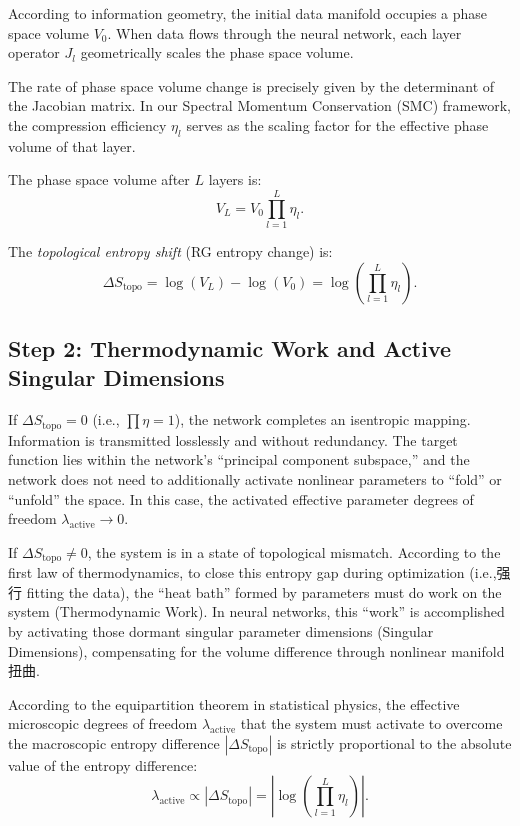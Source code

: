 \documentclass[11pt, a4paper]{article}
\theoremstyle{plain}
\begin{document}
According to information geometry, the initial data manifold occupies a phase space volume $V_0$. When data flows through the neural network, each layer operator $J_l$ geometrically scales the phase space volume.

The rate of phase space volume change is precisely given by the determinant of the Jacobian matrix. In our Spectral Momentum Conservation (SMC) framework, the compression efficiency $\eta_l$ serves as the scaling factor for the effective phase volume of that layer.

The phase space volume after $L$ layers is:
\begin{equation}
V_L = V_0 \prod_{l=1}^{L} \eta_l.
\end{equation}

The \emph{topological entropy shift} (RG entropy change) is:
\begin{equation}
\Delta S_{\text{topo}} = \log(V_L) - \log(V_0) = \log\left(\prod_{l=1}^{L} \eta_l\right).
\end{equation}

\subsection{Step 2: Thermodynamic Work and Active Singular Dimensions}

If $\Delta S_{\text{topo}} = 0$ (i.e., $\prod\eta = 1$), the network completes an isentropic mapping. Information is transmitted losslessly and without redundancy. The target function lies within the network's ``principal component subspace,'' and the network does not need to additionally activate nonlinear parameters to ``fold'' or ``unfold'' the space. In this case, the activated effective parameter degrees of freedom $\lambda_{\text{active}} \to 0$.

If $\Delta S_{\text{topo}} \neq 0$, the system is in a state of topological mismatch. According to the first law of thermodynamics, to close this entropy gap during optimization (i.e.,强行 fitting the data), the ``heat bath'' formed by parameters must do work on the system (Thermodynamic Work). In neural networks, this ``work'' is accomplished by activating those dormant singular parameter dimensions (Singular Dimensions), compensating for the volume difference through nonlinear manifold扭曲.

According to the equipartition theorem in statistical physics, the effective microscopic degrees of freedom $\lambda_{\text{active}}$ that the system must activate to overcome the macroscopic entropy difference $|\Delta S_{\text{topo}}|$ is strictly proportional to the absolute value of the entropy difference:
\begin{equation}
\lambda_{\text{active}} \propto |\Delta S_{\text{topo}}| = \left| \log\left(\prod_{l=1}^{L} \eta_l\right) \right|.
\label{eq:lambda_active}
\end{equation}
\end{document}

